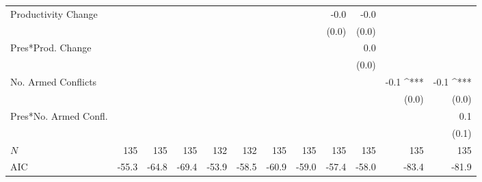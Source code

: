 \documentclass[a4paper]{article}\usepackage[]{graphicx}\usepackage[]{color}
\begin{document}
\begin{table}[ht]
\begin{center}
{{\begin{tabular}{ l D{.}{.}{1}D{.}{.}{1}D{.}{.}{1}D{.}{.}{1}D{.}{.}{1}D{.}{.}{1}D{.}{.}{1}D{.}{.}{1}D{.}{.}{1}D{.}{.}{1}D{.}{.}{1} }
Productivity Change   &                 &                 &                 &                 &                 &                 &                 & -0.0            & -0.0            &                 &                \\ 
                      &                 &                 &                 &                 &                 &                 &                 & (0.0)           & (0.0)           &                 &                \\ 
Pres*Prod. Change     &                 &                 &                 &                 &                 &                 &                 &                 & 0.0             &                 &                \\ 
                      &                 &                 &                 &                 &                 &                 &                 &                 & (0.0)           &                 &                \\ 
No. Armed Conflicts   &                 &                 &                 &                 &                 &                 &                 &                 &                 & -0.1 ^{***}     & -0.1 ^{***}    \\ 
                      &                 &                 &                 &                 &                 &                 &                 &                 &                 & (0.0)           & (0.0)          \\ 
Pres*No. Armed Confl. &                 &                 &                 &                 &                 &                 &                 &                 &                 &                 & 0.1            \\ 
                      &                 &                 &                 &                 &                 &                 &                 &                 &                 &                 & (0.1)           \\
 $N$                   & 135             & 135             & 135             & 132             & 132             & 135             & 135             & 135             & 135             & 135             & 135            \\ 
AIC                   & -55.3           & -64.8           & -69.4           & -53.9           & -58.5           & -60.9           & -59.0           & -57.4           & -58.0           & -83.4           & -81.9          \\ 

\end{tabular}}}
\end{center}
\end{table}
\end{document}
